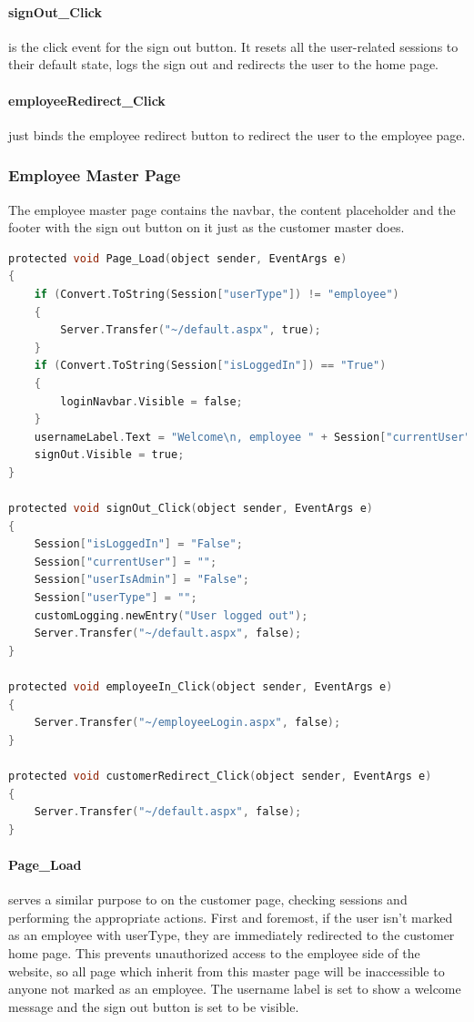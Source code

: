 ﻿\documentclass{article}
\begin{document}
    \paragraph{signOut\_Click} is the click event for the sign out button.
    It resets all the user-related sessions to their default state, logs the sign out and redirects the user to the home page.
    \paragraph{employeeRedirect\_Click} just binds the employee redirect button to redirect the user to the employee page.
    \newpage
    \subsubsection{Employee Master Page}
    The employee master page contains the navbar, the content placeholder and the footer with the sign out button on it just as the customer master does.
    \begin{lstlisting}[language=C]
protected void Page_Load(object sender, EventArgs e)
{
    if (Convert.ToString(Session["userType"]) != "employee")
    {
        Server.Transfer("~/default.aspx", true);
    }
    if (Convert.ToString(Session["isLoggedIn"]) == "True")
    {
        loginNavbar.Visible = false;
    }
    usernameLabel.Text = "Welcome\n, employee " + Session["currentUser"] + "!";
    signOut.Visible = true;
}

protected void signOut_Click(object sender, EventArgs e)
{
    Session["isLoggedIn"] = "False";
    Session["currentUser"] = "";
    Session["userIsAdmin"] = "False";
    Session["userType"] = "";
    customLogging.newEntry("User logged out");
    Server.Transfer("~/default.aspx", false);
}

protected void employeeIn_Click(object sender, EventArgs e)
{
    Server.Transfer("~/employeeLogin.aspx", false);
}

protected void customerRedirect_Click(object sender, EventArgs e)
{
    Server.Transfer("~/default.aspx", false);
}
    \end{lstlisting}
    \paragraph{Page\_Load} serves a similar purpose to on the customer page, checking sessions and performing the appropriate actions.
    First and foremost, if the user isn't marked as an employee with userType, they are immediately redirected to the customer home page.
    This prevents unauthorized access to the employee side of the website, so all page which inherit from this master page will be inaccessible to anyone not marked as an employee.
    The username label is set to show a welcome message and the sign out button is set to be visible.
\end{document}
